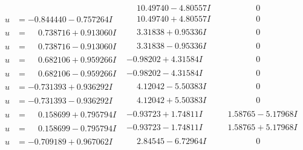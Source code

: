 \documentclass[1p]{elsarticle_modified}
\theoremstyle{definition}
\begin{document}
$$\begin{array}{c|c|c}
 & \phantom{-}10.49740 - 4.80557 I & \phantom{-0.000000 } 0 \\ \hline\begin{aligned}
u &= -0.844440 - 0.757264 I\end{aligned}
 & \phantom{-}10.49740 + 4.80557 I & \phantom{-0.000000 } 0 \\ \hline\begin{aligned}
u &= \phantom{-}0.738716 + 0.913060 I\end{aligned}
 & \phantom{-}3.31838 + 0.95336 I & \phantom{-0.000000 } 0 \\ \hline\begin{aligned}
u &= \phantom{-}0.738716 - 0.913060 I\end{aligned}
 & \phantom{-}3.31838 - 0.95336 I & \phantom{-0.000000 } 0 \\ \hline\begin{aligned}
u &= \phantom{-}0.682106 + 0.959266 I\end{aligned}
 & -0.98202 + 4.31584 I & \phantom{-0.000000 } 0 \\ \hline\begin{aligned}
u &= \phantom{-}0.682106 - 0.959266 I\end{aligned}
 & -0.98202 - 4.31584 I & \phantom{-0.000000 } 0 \\ \hline\begin{aligned}
u &= -0.731393 + 0.936292 I\end{aligned}
 & \phantom{-}4.12042 - 5.50383 I & \phantom{-0.000000 } 0 \\ \hline\begin{aligned}
u &= -0.731393 - 0.936292 I\end{aligned}
 & \phantom{-}4.12042 + 5.50383 I & \phantom{-0.000000 } 0 \\ \hline\begin{aligned}
u &= \phantom{-}0.158699 + 0.795794 I\end{aligned}
 & -0.93723 + 1.74811 I & \phantom{-}1.58765 - 5.17968 I \\ \hline\begin{aligned}
u &= \phantom{-}0.158699 - 0.795794 I\end{aligned}
 & -0.93723 - 1.74811 I & \phantom{-}1.58765 + 5.17968 I \\ \hline\begin{aligned}
u &= -0.709189 + 0.967062 I\end{aligned}
 & \phantom{-}2.84545 - 6.72964 I & \phantom{-0.000000 } 0 \\ \hline\begin{aligned}

\end{aligned}
\end{array}$$
\end{document}

